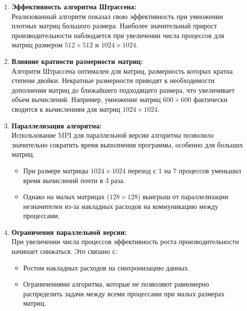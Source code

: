 \begin{enumerate}
\item \textbf{Эффективность алгоритма Штрассена:}  \\
   Реализованный алгоритм показал свою эффективность при умножении плотных матриц большого размера. Наиболее значительный прирост производительности наблюдается при увеличении числа процессов для матриц размером \(512 \times 512\) и \(1024 \times 1024\).

\item \textbf{Влияние кратности размерности матриц:} \\ 
   Алгоритм Штрассена оптимален для матриц, размерность которых кратна степени двойки. Некратные размерности приводят к необходимости дополнения матриц до ближайшего подходящего размера, что увеличивает объем вычислений. Например, умножение матриц \(600 \times 600\) фактически сводится к вычислениям для матриц \(1024 \times 1024\).

\item \textbf{Параллелизация алгоритма:}  \\
   Использование MPI для параллельной версии алгоритма позволило значительно сократить время выполнения программы, особенно для больших матриц.  
   \begin{itemize}
       \item При размере матрицы \(1024 \times 1024\) переход с \(1\) на \(7\) процессов уменьшил время вычислений почти в \(3\) раза.
       \item Однако на малых матрицах (\(128 \times 128\)) выигрыш от параллелизации незначителен из-за накладных расходов на коммуникацию между процессами.
   \end{itemize}

\item \textbf{Ограничения параллельной версии:}  \\
   При увеличении числа процессов эффективность роста производительности начинает снижаться. Это связано с:
   \begin{itemize}
       \item Ростом накладных расходов на синхронизацию данных.
       \item Ограничениями алгоритма, которые не позволяют равномерно распределить задачи между всеми процессами при малых размерах матриц.
   \end{itemize}
\end{enumerate}
